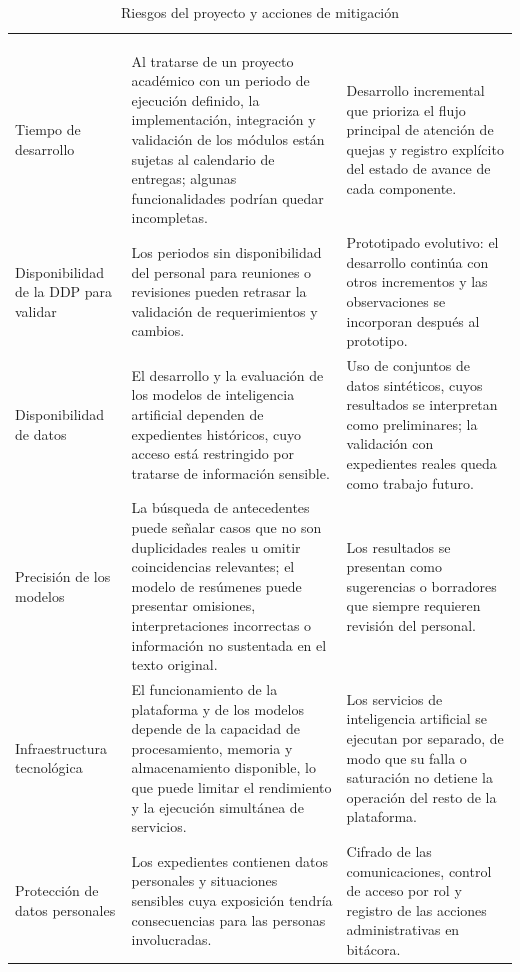 \small
\renewcommand{\arraystretch}{1.25}
\setlength{\tabcolsep}{4pt}
\begin{longtable}{|L{3.0cm}|L{6.4cm}|L{6.2cm}|}
	\hiderowcolors\caption{Riesgos del proyecto y acciones de mitigación}
	\label{tab:riesgos} \\ \showrowcolors
	\hline
	 &  &  \\
	\hline
	\endfirsthead
	\hline
	 &  &  \\
	\hline
	\endhead
	Tiempo de desarrollo & Al tratarse de un proyecto académico con un periodo de ejecución definido, la implementación, integración y validación de los módulos están sujetas al calendario de entregas; algunas funcionalidades podrían quedar incompletas. & Desarrollo incremental que prioriza el flujo principal de atención de quejas y registro explícito del estado de avance de cada componente. \\ \hline
	Disponibilidad de la DDP para validar & Los periodos sin disponibilidad del personal para reuniones o revisiones pueden retrasar la validación de requerimientos y cambios. & Prototipado evolutivo: el desarrollo continúa con otros incrementos y las observaciones se incorporan después al prototipo. \\ \hline
	Disponibilidad de datos & El desarrollo y la evaluación de los modelos de inteligencia artificial dependen de expedientes históricos, cuyo acceso está restringido por tratarse de información sensible. & Uso de conjuntos de datos sintéticos, cuyos resultados se interpretan como preliminares; la validación con expedientes reales queda como trabajo futuro. \\ \hline
	Precisión de los modelos & La búsqueda de antecedentes puede señalar casos que no son duplicidades reales u omitir coincidencias relevantes; el modelo de resúmenes puede presentar omisiones, interpretaciones incorrectas o información no sustentada en el texto original. & Los resultados se presentan como sugerencias o borradores que siempre requieren revisión del personal. \\ \hline
	Infraestructura tecnológica & El funcionamiento de la plataforma y de los modelos depende de la capacidad de procesamiento, memoria y almacenamiento disponible, lo que puede limitar el rendimiento y la ejecución simultánea de servicios. & Los servicios de inteligencia artificial se ejecutan por separado, de modo que su falla o saturación no detiene la operación del resto de la plataforma. \\ \hline
	Protección de datos personales & Los expedientes contienen datos personales y situaciones sensibles cuya exposición tendría consecuencias para las personas involucradas. & Cifrado de las comunicaciones, control de acceso por rol y registro de las acciones administrativas en bitácora. \\ \hline
\end{longtable}
\normalsize
\setlength{\tabcolsep}{6pt}
\renewcommand{\arraystretch}{1}

